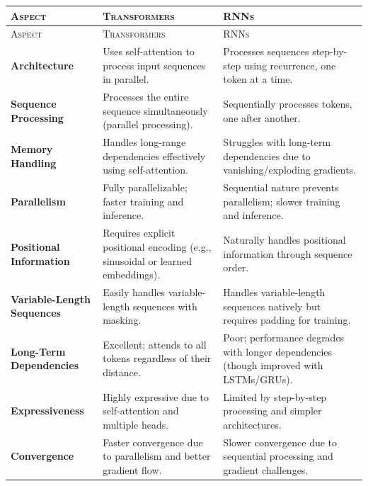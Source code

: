 \begin{longtable}{|>{\raggedright\arraybackslash}p{3.5cm}|>{\raggedright\arraybackslash}p{6cm}|>{\raggedright\arraybackslash}p{6cm}|}
\hline
\textsc{Aspect} & \textsc{Transformers} & \textsc{RNNs} \\ \hline
\endfirsthead
\hline
\textsc{Aspect} & \textsc{Transformers} & \textsc{RNNs} \\ \hline
\endhead
\hline
\endfoot
\hline
\endlastfoot

\textbf{Architecture} & Uses self-attention to process input sequences in parallel. & Processes sequences step-by-step using recurrence, one token at a time. \\ \hline

\textbf{Sequence Processing} & Processes the entire sequence simultaneously (parallel processing). & Sequentially processes tokens, one after another. \\ \hline

\textbf{Memory Handling} & Handles long-range dependencies effectively using self-attention. & Struggles with long-term dependencies due to vanishing/exploding gradients. \\ \hline

\textbf{Parallelism} & Fully parallelizable; faster training and inference. & Sequential nature prevents parallelism; slower training and inference. \\ \hline

\textbf{Positional Information} & Requires explicit positional encoding (e.g., sinusoidal or learned embeddings). & Naturally handles positional information through sequence order. \\ \hline

\textbf{Variable-Length Sequences} & Easily handles variable-length sequences with masking. & Handles variable-length sequences natively but requires padding for training. \\ \hline

\textbf{Long-Term Dependencies} & Excellent; attends to all tokens regardless of their distance. & Poor; performance degrades with longer dependencies (though improved with LSTMs/GRUs). \\ \hline

\textbf{Expressiveness} & Highly expressive due to self-attention and multiple heads. & Limited by step-by-step processing and simpler architectures. \\ \hline

\textbf{Convergence} & Faster convergence due to parallelism and better gradient flow. & Slower convergence due to sequential processing and gradient challenges. \\ \hline


\end{longtable}
